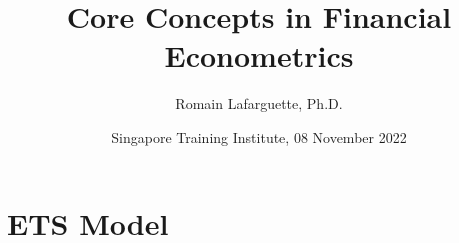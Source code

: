 \documentclass{beamer}
\title[Concepts]{Core Concepts in Financial Econometrics}
\author[R. Lafarguette]{Romain Lafarguette, Ph.D.}
\institute[IMF]{ADIA Quant \& IMF External Consultant}
\date[STI, 08 Nov 2022]{Singapore Training Institute, 08 November 2022}
\begin{document}
\begingroup
\renewcommand{\insertframenumber}{}
\begin{frame}
\maketitle
\end{frame}
\endgroup



  






\section{ETS Model}




\end{document}
